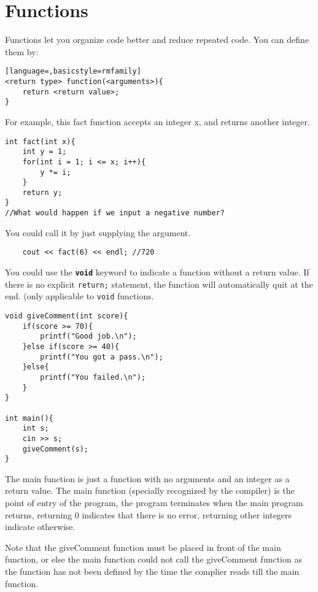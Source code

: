 \section{Functions}

Functions let you organize code better and reduce repeated code. You can define them by:

\begin{lstlisting}[language=,basicstyle=rmfamily]
<return type> function(<arguments>){
    return <return value>;
}
\end{lstlisting}

For example, this fact function accepts an integer x, and returns another integer.

\begin{lstlisting}
int fact(int x){
    int y = 1;
    for(int i = 1; i <= x; i++){
        y *= i;
    }
    return y;
}
//What would happen if we input a negative number?
\end{lstlisting}

You could call it by just supplying the argument.

\begin{lstlisting}
    cout << fact(6) << endl; //720
\end{lstlisting}

You could use the \texttt{\textbf{void}} keyword to indicate a function without a return value. If there is no explicit \texttt{return;} statement, the function will automatically quit at the end. (only applicable to \texttt{void} functions.

\begin{lstlisting}
void giveComment(int score){
    if(score >= 70){
        printf("Good job.\n");
    }else if(score >= 40){
        printf("You got a pass.\n");
    }else{
        printf("You failed.\n");
    }
}

int main(){
    int s;
    cin >> s;
    giveComment(s);
}
\end{lstlisting}

The main function is just a function with no arguments and an integer as a return value. The main function (specially recognized by the compiler) is the point of entry of the program, the program terminates when the main program returns, returning 0 indicates that there is no error, returning other integers indicate otherwise.
\vspace{6mm}

Note that the giveComment function must be placed in front of the main function, or else the main function could not call the giveComment function as the function has not been defined by the time the complier reads till the main function. 